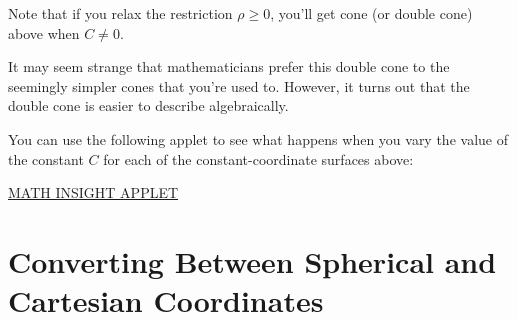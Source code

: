 \documentclass{ximera}
\begin{document}
\begin{image}
\end{image}

Note that if you relax the restriction $\rho\geq 0$, you'll get cone (or double cone) above when $C\neq 0$.

It may seem strange that mathematicians prefer this double cone to the seemingly simpler cones that you're used to. However, it turns out that the double cone is easier to describe algebraically.

You can use the following applet to see what happens when you vary the value of the constant $C$ for each of the constant-coordinate surfaces above:

\href{https://mathinsight.org/spherical_coordinates}{MATH INSIGHT APPLET}

\section*{Converting Between Spherical and Cartesian Coordinates}
\end{document}
